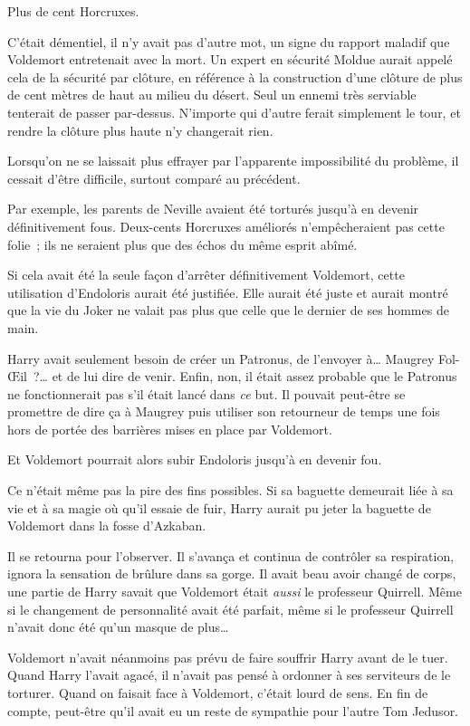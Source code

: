 Plus de cent Horcruxes.

C'était démentiel, il n'y avait pas d'autre mot, un signe du rapport maladif que Voldemort entretenait avec la mort. Un expert en sécurité Moldue aurait appelé cela de la sécurité par clôture, en référence à la construction d'une clôture de plus de cent mètres de haut au milieu du désert. Seul un ennemi très serviable tenterait de passer par-dessus. N'importe qui d'autre ferait simplement le tour, et rendre la clôture plus haute n'y changerait rien.

Lorsqu'on ne se laissait plus effrayer par l'apparente impossibilité du problème, il cessait d'être difficile, surtout comparé au précédent.

Par exemple, les parents de Neville avaient été torturés jusqu'à en devenir définitivement fous. Deux-cents Horcruxes améliorés n'empêcheraient pas cette folie~; ils ne seraient plus que des échos du même esprit abîmé.

Si cela avait été la seule façon d'arrêter définitivement Voldemort, cette utilisation d'Endoloris aurait été justifiée. Elle aurait été juste et aurait montré que la vie du Joker ne valait pas plus que celle que le dernier de ses hommes de main.

Harry avait seulement besoin de créer un Patronus, de l'envoyer à… Maugrey Fol-Œil~?… et de lui dire de venir. Enfin, non, il était assez probable que le Patronus ne fonctionnerait pas s'il était lancé dans \emph{ce} but. Il pouvait peut-être se promettre de dire ça à Maugrey puis utiliser son retourneur de temps une fois hors de portée des barrières mises en place par Voldemort.

Et Voldemort pourrait alors subir Endoloris jusqu'à en devenir fou.

Ce n'était même pas la pire des fins possibles. Si sa baguette demeurait liée à sa vie et à sa magie où qu'il essaie de fuir, Harry aurait pu jeter la baguette de Voldemort dans la fosse d'Azkaban.

Il se retourna pour l'observer. Il s'avança et continua de contrôler sa respiration, ignora la sensation de brûlure dans sa gorge. Il avait beau avoir changé de corps, une partie de Harry savait que Voldemort était \emph{aussi} le professeur Quirrell. Même si le changement de personnalité avait été parfait, même si le professeur Quirrell n'avait donc été qu'un masque de plus…

Voldemort n'avait néanmoins pas prévu de faire souffrir Harry avant de le tuer. Quand Harry l'avait agacé, il n'avait pas pensé à ordonner à ses serviteurs de le torturer. Quand on faisait face à Voldemort, c'était lourd de sens. En fin de compte, peut-être qu'il avait eu un reste de sympathie pour l'autre Tom Jedusor.

